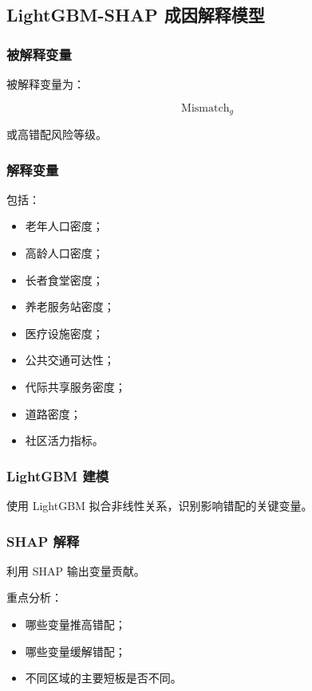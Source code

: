 \subsection{LightGBM-SHAP 成因解释模型}

\subsubsection{被解释变量}

被解释变量为：

\begin{equation}
\operatorname{Mismatch}_g
\end{equation}

或高错配风险等级。

\subsubsection{解释变量}

包括：

\begin{itemize}
\item 老年人口密度；
\item 高龄人口密度；
\item 长者食堂密度；
\item 养老服务站密度；
\item 医疗设施密度；
\item 公共交通可达性；
\item 代际共享服务密度；
\item 道路密度；
\item 社区活力指标。
\end{itemize}

\subsubsection{LightGBM 建模}

使用 LightGBM 拟合非线性关系，识别影响错配的关键变量。

\subsubsection{SHAP 解释}

利用 SHAP 输出变量贡献。

重点分析：

\begin{itemize}
\item 哪些变量推高错配；
\item 哪些变量缓解错配；
\item 不同区域的主要短板是否不同。
\end{itemize}


